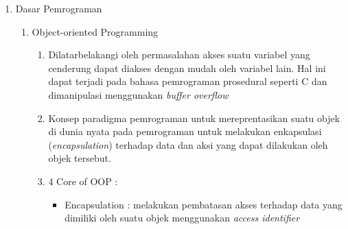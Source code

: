 \documentclass{article}
\begin{document}
\begin{enumerate}
\begin{enumerate}
\begin{enumerate}
\begin{itemize}
\begin{enumerate}
\begin{itemize}
                            \item Sinkronisasi (Cara pemahaman bit berdasarkan panjang dan format yang disepakati dua pihak)
                        \end{itemize}
                        \item Contoh beberapa protokol yang biasa digunakan adalah UART, I2C, dan SPI
                    \end{enumerate}
                    \item Media 
                    \begin{itemize}
                        \item Media yang biasanya digunakan untuk sistem internal (antar komponen dalam UAV) adalah \emph{wired}, sementara media yang biasa digunakan untuk sistem eksternal adalah \emph{wireless}
                        \item Contoh media \emph{wired} adalah kabel UART dan SPI
                        \item Contoh media \emph{wireless} adalah dongle wifi dan modul wifi yang terpasang pada \emph{flight controller}
                    \end{itemize}
                \end{itemize}
                \item Beberapa protokol yang digunakakn
            \end{enumerate}
        \end{enumerate}
        \item Dasar Pemrograman
        \begin{enumerate}
            \item Object-oriented Programming
            \begin{enumerate}
                \item Dilatarbelakangi oleh permasalahan akses suatu variabel yang cenderung dapat diakses dengan mudah oleh variabel lain. Hal ini dapat terjadi pada bahasa pemrograman prosedural seperti C dan dimanipulasi menggunakan \emph{buffer overflow}
                \item Konsep paradigma pemrograman untuk mereprentasikan suatu objek di dunia nyata pada pemrograman untuk melakukan enkapsulasi (\emph{encapsulation}) terhadap data dan aksi yang dapat dilakukan oleh objek tersebut.
                \item 4 Core of OOP : 
                \begin{itemize}
                    \item Encapsulation : melakukan pembatasan akses terhadap data yang dimiliki oleh suatu objek menggunakan \emph{access identifier}

\end{itemize}
\end{enumerate}
\end{enumerate}
\end{enumerate}
\end{document}
